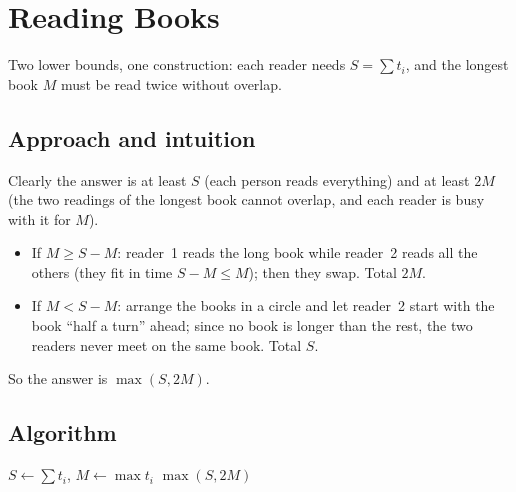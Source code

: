 \section{Reading Books}
\label{sec:g-reading-books}


\begin{patternbox}
Two lower bounds, one construction: each reader needs $S=\sum t_i$, and the
longest book $M$ must be read twice without overlap.
\end{patternbox}

\subsection*{Approach and intuition}

Clearly the answer is at least $S$ (each person reads everything) and at
least $2M$ (the two readings of the longest book cannot overlap, and each
reader is busy with it for $M$).

\begin{itemize}
  \item If $M\ge S-M$: reader~1 reads the long book while reader~2 reads all
        the others (they fit in time $S-M\le M$); then they swap. Total $2M$.
  \item If $M<S-M$: arrange the books in a circle and let reader~2 start
        with the book ``half a turn'' ahead; since no book is longer than the
        rest, the two readers never meet on the same book. Total $S$.
\end{itemize}
So the answer is $\max(S,2M)$.

\subsection*{Algorithm}
\begin{algorithmic}[1]
\State $S\gets\sum t_i$, $M\gets\max t_i$
\State \Return $\max(S,2M)$
\end{algorithmic}


